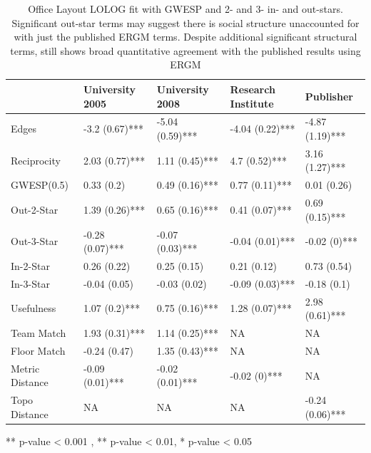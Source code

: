 \documentclass[
]{statsoc}
\begin{document}
\begin{table}

\caption{\label{tab:unnamed-chunk-4}\label{tab:sailer_lolog_gwesp_star}
      Office Layout LOLOG fit with GWESP and 2- and 3- in- and out-stars. Significant out-star terms may suggest there is social structure unaccounted for with just the published ERGM terms. Despite additional significant structural terms, still shows broad quantitative agreement with the published results using ERGM}
\centering
\begin{threeparttable}
\begin{tabular}[t]{lllll}
\toprule
  & University 2005 & University 2008 & Research Institute & Publisher\\
\midrule
\rowcolor{gray!6}  Edges & -3.2 (0.67)*** & -5.04 (0.59)*** & -4.04 (0.22)*** & -4.87 (1.19)***\\
Reciprocity & 2.03 (0.77)*** & 1.11 (0.45)*** & 4.7 (0.52)*** & 3.16 (1.27)***\\
\rowcolor{gray!6}  GWESP(0.5) & 0.33 (0.2) & 0.49 (0.16)*** & 0.77 (0.11)*** & 0.01 (0.26)\\
Out-2-Star & 1.39 (0.26)*** & 0.65 (0.16)*** & 0.41 (0.07)*** & 0.69 (0.15)***\\
\rowcolor{gray!6}  Out-3-Star & -0.28 (0.07)*** & -0.07 (0.03)*** & -0.04 (0.01)*** & -0.02 (0)***\\
\addlinespace
In-2-Star & 0.26 (0.22) & 0.25 (0.15) & 0.21 (0.12) & 0.73 (0.54)\\
\rowcolor{gray!6}  In-3-Star & -0.04 (0.05) & -0.03 (0.02) & -0.09 (0.03)*** & -0.18 (0.1)\\
Usefulness & 1.07 (0.2)*** & 0.75 (0.16)*** & 1.28 (0.07)*** & 2.98 (0.61)***\\
\rowcolor{gray!6}  Team Match & 1.93 (0.31)*** & 1.14 (0.25)*** & NA & NA\\
Floor Match & -0.24 (0.47) & 1.35 (0.43)*** & NA & NA\\
\addlinespace
\rowcolor{gray!6}  Metric Distance & -0.09 (0.01)*** & -0.02 (0.01)*** & -0.02 (0)*** & NA\\
Topo Distance & NA & NA & NA & -0.24 (0.06)***\\
\bottomrule
\end{tabular}
\begin{tablenotes}
\item *** p-value < 0.001 , ** p-value < 0.01, * p-value < 0.05
\end{tablenotes}
\end{threeparttable}
\end{table}
\end{document}
